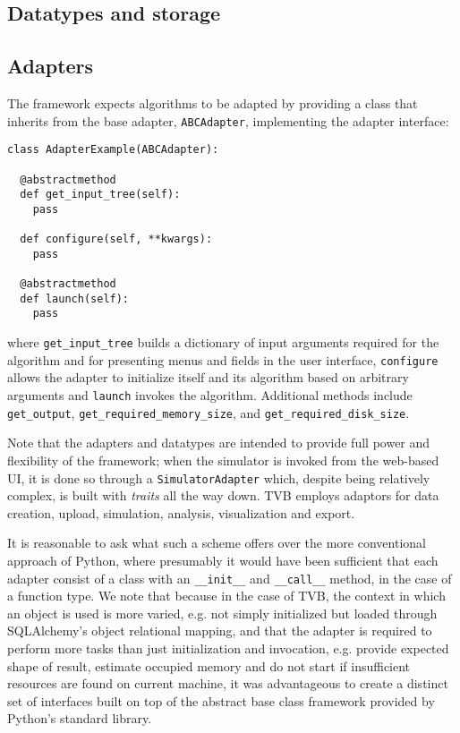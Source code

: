 \documentclass{bioinfo}
\begin{document}
\subsection{Datatypes and storage}
\subsection{Adapters}

The framework expects algorithms to be adapted by providing a class
that inherits from the base adapter, \texttt{ABCAdapter}, implementing 
the adapter interface:

\begin{lstlisting}[caption={Excerpt of the ABCAdapter},
                   label={lst:ABCAdapter}]
class AdapterExample(ABCAdapter):

  @abstractmethod
  def get_input_tree(self):
  	pass

  def configure(self, **kwargs):
  	pass

  @abstractmethod
  def launch(self):
  	pass
\end{lstlisting}


\noindent where \texttt{get\_input\_tree} builds a dictionary of input
arguments required for the algorithm and for presenting menus and fields in the
user interface, \texttt{configure} allows the adapter to initialize itself and
its algorithm based on arbitrary arguments and \texttt{launch} invokes the
algorithm.  Additional methods include \texttt{get\_output},
\texttt{get\_required\_memory\_size}, and \texttt{get\_required\_disk\_size}.

Note that the adapters and datatypes are intended to provide full power and
flexibility of the framework; when the simulator is invoked from the web-based
UI, it is done so through a \texttt{SimulatorAdapter} which, despite being
relatively complex, is built with \emph{traits} all the way down.  TVB employs
adaptors for data creation, upload, simulation, analysis, visualization and
export. 

It is reasonable to ask what such a scheme offers over the more 
conventional approach of Python, where presumably it would have been
sufficient that each adapter consist of a class with an \texttt{\_\_init\_\_}
and \texttt{\_\_call\_\_} method, in the case of a function type. 
We note that because in the case of TVB, the context in which an object
is used is more varied, e.g. not simply initialized but loaded through 
SQLAlchemy's object relational mapping, and that the adapter is required to perform more tasks
than just initialization and invocation, e.g. provide expected shape of 
result, estimate occupied memory and do not start if insufficient resources are found on current machine,
 it was advantageous to create a distinct set of interfaces built on top of
the abstract base class framework provided by Python's standard library.
\end{document}

